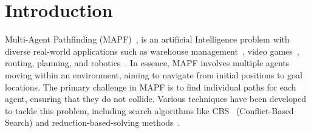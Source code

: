 \section{Introduction}\label{sec:introduction}



Multi-Agent Pathfinding (MAPF)~\cite{ststfekomawaliatcokubabo19a,ststfekomawaliatcokubabo19b,stern19a}, is an artificial Intelligence problem with diverse real-world applications such as warehouse management~\cite{wurman2008coordinating}, video games~\cite{ma2017feasibility}, routing, planning, and robotics~\cite{veloso2015cobots}. In essence, MAPF involves multiple agents moving within an environment, aiming to navigate from initial positions to goal locations. The primary challenge in MAPF is to find individual paths for each agent, ensuring that they do not collide. Various techniques have been developed to tackle this problem, including search algorithms like CBS~\cite{shstfest15a} (Conflict-Based Search) and reduction-based-solving methods~\cite{barsva19a}.

